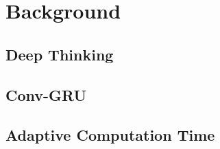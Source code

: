 \section{Background}
\subsection{Deep Thinking}
\subsection{Conv-GRU}
\subsection{Adaptive Computation Time}